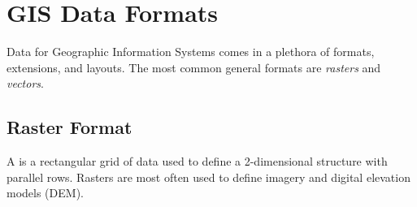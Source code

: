 %


\section*{GIS Data Formats}


Data for Geographic Information Systems comes in a plethora of formats, 
extensions, and layouts.  The most common general formats are 
\emph{rasters} and \emph{vectors}.



\subsection*{Raster Format}

A  is a rectangular grid of data used to define 
a 2-dimensional structure with parallel rows.  Rasters are most
often used to define imagery and digital elevation models (DEM). 




